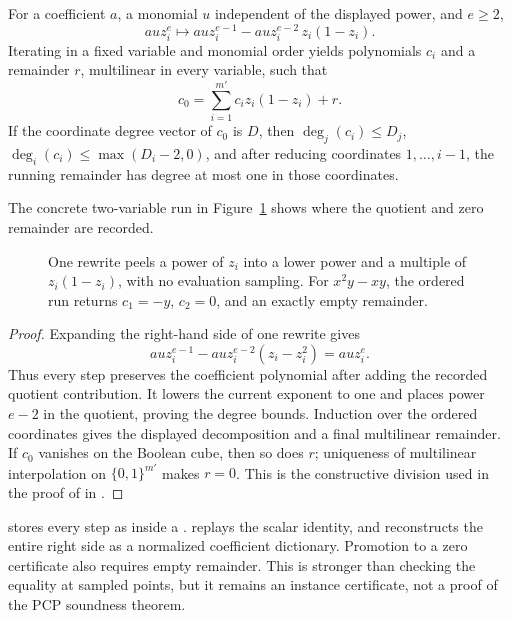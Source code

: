 \begin{lemma}
\label{lem:zero-rewrite}
For a coefficient \(a\), a monomial \(u\) independent of the displayed power,
and \(e\geq2\),
\[
 a u z_i^e
 \longmapsto
 a u z_i^{e-1}-a u z_i^{e-2}\,z_i(1-z_i).
\]
Iterating in a fixed variable and monomial order yields polynomials \(c_i\) and
a remainder \(r\), multilinear in every variable, such that
\[
 c_0=\sum_{i=1}^{m'}c_i z_i(1-z_i)+r.
\]
If the coordinate degree vector of \(c_0\) is \(D\), then
\(\deg_j(c_i)\leq D_j\), \(\deg_i(c_i)\leq\max(D_i-2,0)\), and after reducing
coordinates \(1,\ldots,i-1\), the running remainder has degree at most one in
those coordinates.
\end{lemma}

The concrete two-variable run in Figure~\ref{fig:boolean-ideal-rewrite} shows
where the quotient and zero remainder are recorded.
\begin{figure}[t]
\centering

\caption{One rewrite peels a power of \(z_i\) into a lower power and a multiple of \(z_i(1-z_i)\), with no evaluation sampling.  For \(x^2y-xy\), the ordered run returns \(c_1=-y\), \(c_2=0\), and an exactly empty remainder.}
\label{fig:boolean-ideal-rewrite}
\end{figure}

\begin{proof}
Expanding the right-hand side of one rewrite gives
\[
 a u z_i^{e-1}-a u z_i^{e-2}(z_i-z_i^2)=a u z_i^e.
\]
Thus every step preserves the coefficient polynomial after adding the recorded
quotient contribution.  It lowers the current exponent to one and places
power \(e-2\) in the quotient, proving the degree bounds.  Induction over the
ordered coordinates gives the displayed decomposition and a final
multilinear remainder.  If \(c_0\) vanishes on the Boolean cube, then so does
\(r\); uniqueness of multilinear interpolation on \(\{0,1\}^{m'}\) makes
\(r=0\).  This is the constructive division used in the proof of
 in
.
\end{proof}

 stores every step as  inside a
.   replays the scalar
identity, and  reconstructs the entire right
side as a normalized coefficient dictionary.  Promotion to a zero certificate
also requires empty remainder.  This is stronger than checking the equality at
sampled points, but it remains an instance certificate, not a proof of the PCP
soundness theorem.

